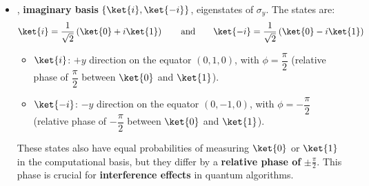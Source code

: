 \begin{itemize}
    \item {}, \textbf{imaginary basis} $\{\ket{i}, \ket{-i}\}$, eigenstates of $\sigma_{y}$. The states are:
    \begin{equation*}
        \ket{i} = \dfrac{1}{\sqrt{2}}\left(\ket{0} + i\ket{1}\right)
        \hspace{2em} \text{and} \hspace{2em}
        \ket{-i} = \dfrac{1}{\sqrt{2}}\left(\ket{0} - i\ket{1}\right)
    \end{equation*}
    \begin{itemize}
        \item $\ket{i}$: $+y$ direction on the equator $\left(0, 1, 0\right)$, with $\phi = \dfrac{\pi}{2}$ (relative phase of $\dfrac{\pi}{2}$ between $\ket{0}$ and $\ket{1}$).
        \item $\ket{-i}$: $-y$ direction on the equator $\left(0, -1, 0\right)$, with $\phi = -\dfrac{\pi}{2}$ (relative phase of $-\dfrac{\pi}{2}$ between $\ket{0}$ and $\ket{1}$).
    \end{itemize}
    These states also have equal probabilities of measuring $\ket{0}$ or $\ket{1}$ in the computational basis, but they differ by a \textbf{relative phase of} $\pm \frac{\pi}{2}$. This phase is crucial for \textbf{interference effects} in quantum algorithms.
\end{itemize}